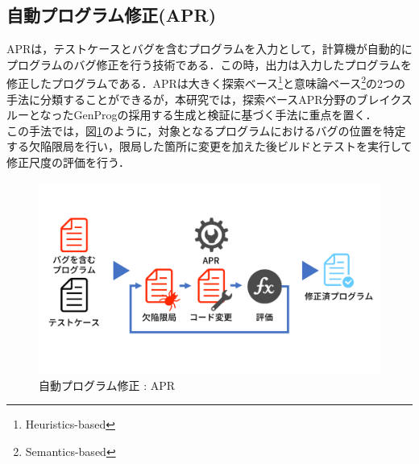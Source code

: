 \documentclass[uplatex,dvipdfmx,a4paper]{jsarticle}
\let\oldcite\cite
\renewcommand{\cite}[1]{\xspace\oldcite{#1}}
\begin{document}
\subsection{自動プログラム修正(APR)}\label{sec:apr}
APRは，テストケースとバグを含むプログラムを入力として，計算機が自動的にプログラムのバグ修正を行う技術である．この時，出力は入力したプログラムを修正したプログラムである．APRは大きく探索ベース\footnote{Heuristics-based}と意味論ベース\footnote{Semantics-based}の2つの手法に分類することができるが，本研究では，探索ベースAPR分野のブレイクスルーとなったGenProg\cite{le2011genprog}の採用する生成と検証\cite{martinez2019astor}に基づく手法に重点を置く．\\
この手法では，図\ref{fig:apr}のように，対象となるプログラムにおけるバグの位置を特定する欠陥限局を行い，限局した箇所に変更を加えた後ビルドとテストを実行して修正尺度の評価を行う．
\begin{figure}[t]
  \centering
  \includegraphics[width=\linewidth]{fig/apr.pdf}
  \caption{自動プログラム修正 : APR}
  \label{fig:apr}
\end{figure}
\end{document}
